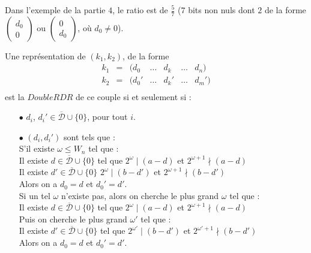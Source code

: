 \documentclass[12pt, a4paper]{memoir}
\newcommand{\dbarre}{\overline{\mathcal{D}}}
\begin{document}
  \begin{Remarque}
   Dans l'exemple de la partie $4$, le ratio est de $\frac{5}{7}$ ($7$ bits non nuls dont $2$ de la forme 
   $\begin{pmatrix} d_0 \\ 0 \end{pmatrix}$ ou $\begin{pmatrix} 0 \\ d_0 \end{pmatrix}$, où $d_0 \neq 0$).
  \end{Remarque}


  \begin{Proposition}
   Une représentation de $(k_1,k_2)$, de la forme 
    $$\begin{array}{cccccccccc}
  k_1 & = & (d_0 & \ldots & d_k  & \ldots & d_n) \\
  k_2 & = & (d_0' & \ldots & d_k' & \ldots & d_m') \\
 \end{array}$$
   est la $DoubleRDR$ de ce couple si et seulement si :
   \begin{itemize}
    \item [$\bullet$] $d_i$, $d_i' \in \dbarre \cup \{0\}$, pour tout $i$.
    \item [$\bullet$] $(d_i,d_i')$ sont tels que : \\
    S'il existe $\omega \leq W_n$ tel que : \\
    Il existe $d \in  \dbarre \cup \{0\}$ tel que $2^{\omega} \mid (a - d)$ et $2^{\omega + 1} \nmid (a - d)$ \\
    Il existe $d' \in  \dbarre \cup \{0\}$ $2^{\omega} \mid (b - d')$ et $2^{\omega + 1} \nmid (b - d')$ \\
    Alors on a $d_0 = d$ et $d_0' = d'$. \\
    Si un tel $\omega$ n'existe pas, alors on cherche le plus grand $\omega$ tel que : \\
    Il existe $d \in \dbarre \cup \{0\}$ tel que $2^{\omega} \mid (a - d)$ et $2^{\omega + 1} \nmid (a - d)$ \\
    Puis on cherche le plus grand $\omega'$ tel que : \\
    Il existe $d' \in \dbarre \cup \{0\}$ tel que $2^{\omega'} \mid (b - d')$ et $2^{\omega' + 1} \nmid (b - d')$ \\
    Alors on a $d_0 = d$ et $d_0' = d'$. \\
    \end{itemize}
  \end{Proposition}
\end{document}
